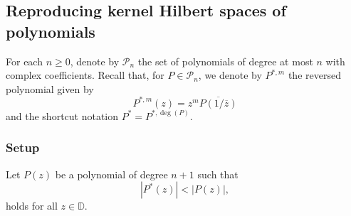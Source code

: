\documentclass[reqno, a4paper]{amsart}
\theoremstyle{plain}
\theoremstyle{definition}
\theoremstyle{remarkstyle}
\numberwithin{equation}{section}
\begin{document}
\subsection{Reproducing kernel Hilbert spaces of polynomials}\label{subsec: rkhs of polynomials}

For each $n\geq 0$, denote by $\mathcal{P}_n$ the set of polynomials of degree at most $n$ with complex coefficients. Recall that, for $P\in \mathcal{P}_n$, we denote by $P^{*, m}$ the reversed polynomial given by  
\begin{equation*}
    P^{*, m}(z)=z^{m}\overline{P(1/\overline{z})}
\end{equation*}
and the shortcut notation $P^{*}=P^{*, \deg(P)}$.


\subsubsection{Setup} Let $P(z)$ be a polynomial of degree $n+1$ such that
\begin{equation}\label{eq:hermite-biehler-inequality}
|P^*(z)|< |P(z)|,
\end{equation}
holds for all $z\in\mathbb{D}$. 
\end{document}
